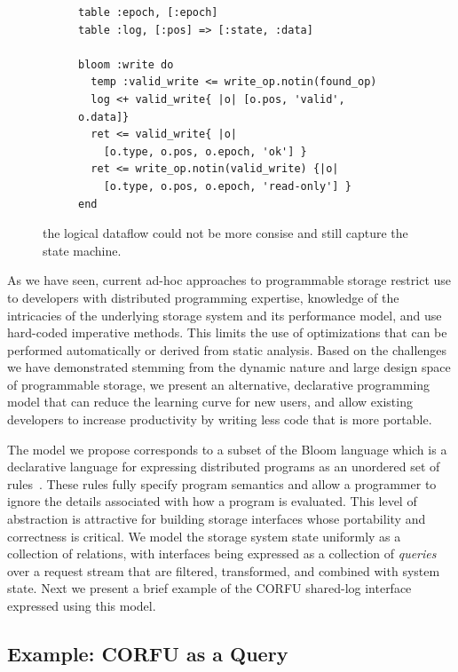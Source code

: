 \begin{figure}[t]
\begin{subfigure}{0.75\columnwidth}
\begin{lstlisting}[title={{\bf (c)}}, label=lst:write, basicstyle=\tiny]
table :epoch, [:epoch]
table :log, [:pos] => [:state, :data]

bloom :write do
  temp :valid_write <= write_op.notin(found_op)
  log <+ valid_write{ |o| [o.pos, 'valid', o.data]}
  ret <= valid_write{ |o|
    [o.type, o.pos, o.epoch, 'ok'] }
  ret <= write_op.notin(valid_write) {|o|
    [o.type, o.pos, o.epoch, 'read-only'] }
end
\end{lstlisting}
\end{subfigure}
\caption{the logical dataflow could not be more consise and still capture the
    state machine.}
\label{fig:pm}
\end{figure}

As we have seen, current ad-hoc approaches to programmable storage restrict
use to developers with distributed programming expertise, knowledge of the
intricacies of the underlying storage system and its performance model, and
use hard-coded imperative methods. This limits the use of optimizations that
can be performed automatically or derived from static analysis.  Based on the
challenges we have demonstrated stemming from the dynamic nature and large
design space of programmable storage, we present an alternative, declarative
programming model that can reduce the learning curve for new users, and allow
existing developers to increase productivity by writing less code that is more
portable.

The model we propose corresponds to a subset of the Bloom language which is a
declarative language for expressing distributed programs as an unordered set
of rules~\cite{alvaro:cidr11}. These rules fully specify program semantics and
allow a programmer to ignore the details associated with how a program is
evaluated. This level of abstraction is attractive for building storage
interfaces whose portability and correctness is critical. We model the
storage system state uniformly as a collection of relations, with interfaces
being expressed as a collection of \emph{queries} over a request stream that
are filtered, transformed, and combined with system state. Next we present a
brief example of the CORFU shared-log interface expressed using this model.

\subsection{Example: CORFU as a Query}

